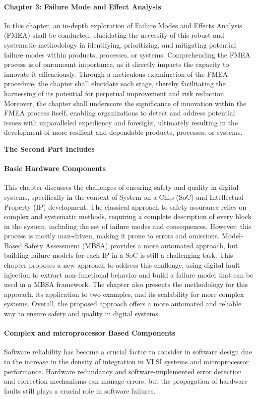 \documentclass[./dissertation.tex]{subfiles}
\begin{document}
\paragraph{Chapter 3: Failure Mode and Effect Analysis}
In this chapter, an in-depth exploration of Failure Modes and Effects Analysis (FMEA) shall be conducted, elucidating the necessity of this robust and systematic methodology in identifying, prioritizing, and mitigating potential failure modes within products, processes, or systems. Comprehending the FMEA process is of paramount importance, as it directly impacts the capacity to innovate it efficaciously. Through a meticulous examination of the FMEA procedure, the chapter shall elucidate each stage, thereby facilitating the harnessing of its potential for perpetual improvement and risk reduction. Moreover, the chapter shall underscore the significance of innovation within the FMEA process itself, enabling organizations to detect and address potential issues with unparalleled expediency and foresight, ultimately resulting in the development of more resilient and dependable products, processes, or systems.


\noindent\textbf{The Second Part Includes}


\paragraph{Basic Hardware Components}
This chapter discusses the challenges of ensuring safety and quality in digital systems, specifically in the context of System-on-a-Chip (SoC) and Intellectual Property (IP) development. The classical approach to safety assurance relies on complex and systematic methods, requiring a complete description of every block in the system, including the set of failure modes and consequences. However, this process is mostly man-driven, making it prone to errors and omissions. Model-Based Safety Assessment (MBSA) provides a more automated approach, but building failure models for each IP in a SoC is still a challenging task. This chapter proposes a new approach to address this challenge, using digital fault injection to extract non-functional behavior and build a failure model that can be used in a MBSA framework. The chapter also presents the methodology for this approach, its application to two examples, and its scalability for more complex systems. Overall, the proposed approach offers a more automated and reliable way to ensure safety and quality in digital systems.
\paragraph{Complex and microprocessor Based Components}
Software reliability has become a crucial factor to consider in software design due to the increase in the density of integration in VLSI systems and microprocessor performance. Hardware redundancy and software-implemented error detection and correction mechanisms can manage errors, but the propagation of hardware faults still plays a crucial role in software failures.
\end{document}
